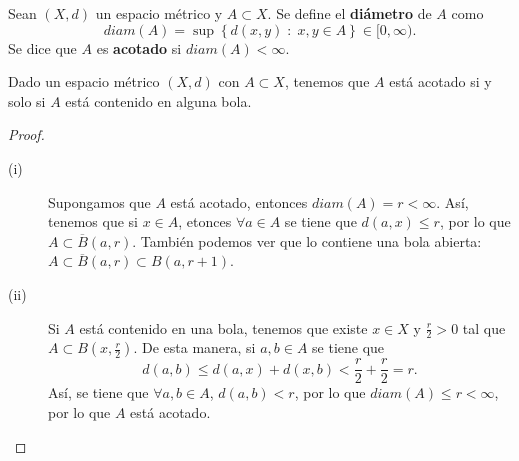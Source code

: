 \begin{definition}
Sean $\displaystyle \left(X,d\right) $ un espacio métrico y $\displaystyle A \subset X $. Se define el \textbf{diámetro} de $\displaystyle A $ como 
\[diam\left(A\right) = \sup \left\{ d\left(x,y\right) \; : \; x,y \in A\right\} \in [0, \infty) .\]
Se dice que $\displaystyle A $ es \textbf{acotado} si $\displaystyle diam\left(A\right) < \infty $.
\end{definition}
\begin{prop}
Dado un espacio métrico $\displaystyle \left(X,d\right) $ con $\displaystyle A \subset X $, tenemos que $\displaystyle A $ está acotado si y solo si $\displaystyle A $ está contenido en alguna bola.
\end{prop}
\begin{proof}
\begin{description}
\item[(i)] Supongamos que $\displaystyle A $ está acotado, entonces $\displaystyle diam\left(A\right) = r < \infty $. Así, tenemos que si $\displaystyle x \in A $, etonces $\displaystyle \forall a \in A $ se tiene que $\displaystyle d\left(a,x\right) \leq r $, por lo que $\displaystyle A \subset \overline{B}\left(a,r\right) $. También podemos ver que lo contiene una bola abierta: $\displaystyle A \subset \overline{B}\left(a, r\right) \subset B\left(a, r+1\right) $.
\item[(ii)] Si $\displaystyle A $ está contenido en una bola, tenemos que existe $\displaystyle x \in X $ y $\displaystyle \frac{r}{2}>0 $ tal que $\displaystyle A \subset B\left(x, \frac{r}{2}\right) $. De esta manera, si $\displaystyle a,b \in A $ se tiene que 
	\[d\left(a,b\right) \leq d\left(a,x\right) + d\left(x,b\right) < \frac{r}{2} + \frac{r}{2} = r .\]
	Así, se tiene que $\displaystyle \forall a,b \in A $, $\displaystyle d\left(a,b\right) < r $, por lo que $\displaystyle diam\left(A\right) \leq r < \infty $, por lo que $\displaystyle A $ está acotado.
\end{description}
\end{proof}

